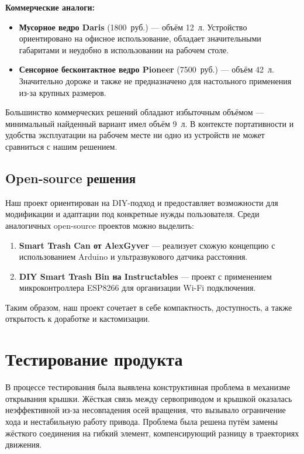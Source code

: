 \documentclass[a4paper, 12pt]{article} %
\begin{document}
\textbf{Коммерческие аналоги:}
\begin{itemize}
    \item \textbf{Мусорное ведро Daris} (1800~руб.) — объём 12~л. Устройство ориентировано на офисное использование, обладает значительными габаритами и неудобно в использовании на рабочем столе.
    
    \item \textbf{Сенсорное бесконтактное ведро Pioneer} (7500~руб.) — объём 42~л. Значительно дороже и также не предназначено для настольного применения из-за крупных размеров.
\end{itemize}

Большинство коммерческих решений обладают избыточным объёмом — минимальный найденный вариант имел объём 9~л. В контексте портативности и удобства эксплуатации на рабочем месте ни одно из устройств не может сравниться с нашим решением.

\subsection*{Open-source решения}

Наш проект ориентирован на DIY-подход и предоставляет возможности для модификации и адаптации под конкретные нужды пользователя. Среди аналогичных open-source проектов можно выделить:

\begin{enumerate}
    \item \textbf{Smart Trash Can от AlexGyver} — реализует схожую концепцию с использованием Arduino и ультразвукового датчика расстояния.
    \item \textbf{DIY Smart Trash Bin на Instructables} — проект с применением микроконтроллера ESP8266 для организации Wi-Fi подключения.
\end{enumerate}

Таким образом, наш проект сочетает в себе компактность, доступность, а также открытость к доработке и кастомизации.

\section{Тестирование продукта}

В процессе тестирования была выявлена конструктивная проблема в механизме открывания крышки. Жёсткая связь между сервоприводом и крышкой оказалась неэффективной из-за несовпадения осей вращения, что вызывало ограничение хода и нестабильную работу привода. Проблема была решена путём замены жёсткого соединения на гибкий элемент, компенсирующий разницу в траекториях движения.
\end{document}
